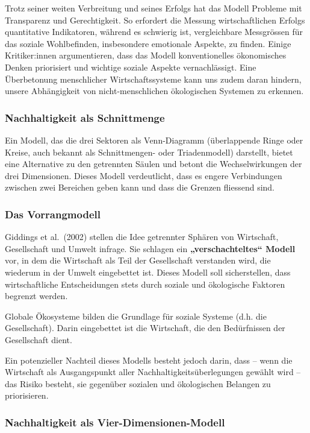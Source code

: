 \documentclass[
  letterpaper,
  DIV=11,
  numbers=noendperiod]{scrartcl}
\begin{document}
Trotz seiner weiten Verbreitung und seines Erfolgs hat das Modell
Probleme mit Transparenz und Gerechtigkeit. So erfordert die Messung
wirtschaftlichen Erfolgs quantitative Indikatoren, während es schwierig
ist, vergleichbare Messgrössen für das soziale Wohlbefinden,
insbesondere emotionale Aspekte, zu finden. Einige Kritiker:innen
argumentieren, dass das Modell konventionelles ökonomisches Denken
priorisiert und wichtige soziale Aspekte vernachlässigt. Eine
Überbetonung menschlicher Wirtschaftssysteme kann uns zudem daran
hindern, unsere Abhängigkeit von nicht-menschlichen ökologischen
Systemen zu erkennen.

\subsubsection{Nachhaltigkeit als
Schnittmenge}\label{nachhaltigkeit-als-schnittmenge}

Ein Modell, das die drei Sektoren als Venn-Diagramm (überlappende Ringe
oder Kreise, auch bekannt als Schnittmengen- oder Triadenmodell)
darstellt, bietet eine Alternative zu den getrennten Säulen und betont
die Wechselwirkungen der drei Dimensionen. Dieses Modell verdeutlicht,
dass es engere Verbindungen zwischen zwei Bereichen geben kann und dass
die Grenzen fliessend sind.

\subsubsection{Das Vorrangmodell}\label{das-vorrangmodell}

Giddings et al.~(2002) stellen die Idee getrennter Sphären von
Wirtschaft, Gesellschaft und Umwelt infrage. Sie schlagen ein
\textbf{„verschachteltes`` Modell} vor, in dem die Wirtschaft als Teil
der Gesellschaft verstanden wird, die wiederum in der Umwelt eingebettet
ist. Dieses Modell soll sicherstellen, dass wirtschaftliche
Entscheidungen stets durch soziale und ökologische Faktoren begrenzt
werden.

Globale Ökosysteme bilden die Grundlage für soziale Systeme (d.h. die
Gesellschaft). Darin eingebettet ist die Wirtschaft, die den
Bedürfnissen der Gesellschaft dient.

Ein potenzieller Nachteil dieses Modells besteht jedoch darin, dass --
wenn die Wirtschaft als Ausgangspunkt aller Nachhaltigkeitsüberlegungen
gewählt wird -- das Risiko besteht, sie gegenüber sozialen und
ökologischen Belangen zu priorisieren.

\subsubsection{Nachhaltigkeit als
Vier-Dimensionen-Modell}\label{nachhaltigkeit-als-vier-dimensionen-modell}
\end{document}
